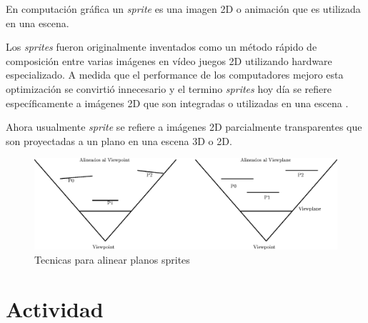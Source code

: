 En computación gráfica un \emph{sprite} es una imagen 2D o animación que es utilizada en una escena.

Los \emph{sprites} fueron originalmente inventados como un método rápido de composición entre varias imágenes en vídeo juegos 2D utilizando hardware especializado. A medida que el performance de los computadores mejoro esta optimización se convirtió innecesario y el termino \emph{sprites} hoy día se refiere específicamente a imágenes 2D que son integradas o utilizadas en una escena \cite{sprites_siggraph}.

Ahora usualmente \emph{sprite} se refiere a imágenes 2D parcialmente transparentes que son proyectadas a un plano en una escena 3D o 2D.
\begin{figure}[H]
\centering
\includegraphics[width=0.9\linewidth]{semana3/bills.eps} 
\caption{Tecnicas para alinear planos sprites}
\end{figure}

\section{Actividad}
